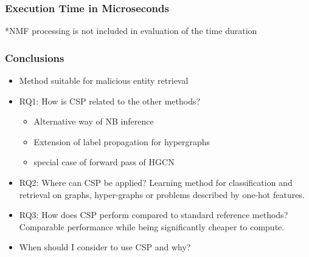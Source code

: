 \documentclass[aspectratio=169]{beamer}
\begin{document}
\begin{frame}
\frametitle{Execution Time in Microseconds}
    
    *NMF processing is not included in evaluation of the time duration
\end{frame}


\begin{frame}
\frametitle{Conclusions}
    \begin{itemize}
        \item Method suitable for malicious entity retrieval 
        \item<2-> RQ1: How is CSP related to the other methods?
        \begin{itemize}
            \item Alternative way of NB inference
            \item Extension of label propagation for hypergraphs
            \item special case of forward pass of HGCN
        \end{itemize}
        \item<3-> RQ2: Where can CSP be applied? 
        Learning method for classification and retrieval on graphs, hyper-graphs or problems described by one-hot features.       
        \item<4-> RQ3: How does CSP perform compared to standard reference methods? Comparable performance while being significantly cheaper to compute.
        \item<5> When should I consider to use CSP and why?
    \end{itemize}
\end{frame}

\end{document}
